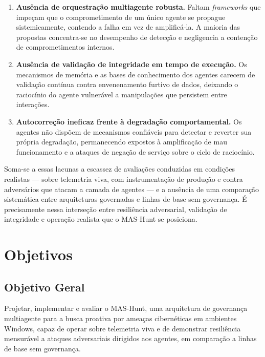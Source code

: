 \begin{enumerate}
  \item \textbf{Ausência de orquestração multiagente robusta.} Faltam
  \emph{frameworks} que impeçam que o comprometimento de um único agente se
  propague sistemicamente, contendo a falha em vez de amplificá-la. A maioria das
  propostas concentra-se no desempenho de detecção e negligencia a contenção de
  comprometimentos internos.

  \item \textbf{Ausência de validação de integridade em tempo de execução.} Os
  mecanismos de memória e as bases de conhecimento dos agentes carecem de
  validação contínua contra envenenamento furtivo de dados, deixando o
  raciocínio do agente vulnerável a manipulações que persistem entre interações.

  \item \textbf{Autocorreção ineficaz frente à degradação comportamental.} Os
  agentes não dispõem de mecanismos confiáveis para detectar e reverter sua
  própria degradação, permanecendo expostos à amplificação de mau funcionamento e
  a ataques de negação de serviço sobre o ciclo de raciocínio.
\end{enumerate}

Soma-se a essas lacunas a escassez de avaliações conduzidas em condições
realistas — sobre telemetria viva, com instrumentação de produção e contra
adversários que atacam a camada de agentes — e a ausência de uma comparação
sistemática entre arquiteturas governadas e linhas de base sem governança. É
precisamente nessa interseção entre resiliência adversarial, validação de
integridade e operação realista que o MAS-Hunt se posiciona.

\section{Objetivos}
\label{sec:objetivos}

\subsection{Objetivo Geral}
\label{subsec:objetivo-geral}

Projetar, implementar e avaliar o MAS-Hunt, uma arquitetura de governança
multiagente para a busca proativa por ameaças cibernéticas em ambientes Windows,
capaz de operar sobre telemetria viva e de demonstrar resiliência mensurável a
ataques adversariais dirigidos aos agentes, em comparação a linhas de base sem
governança.

